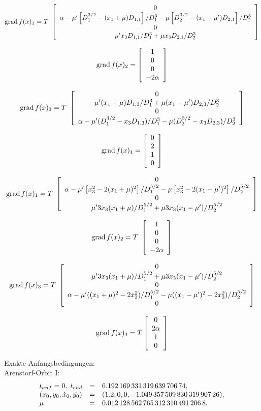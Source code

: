 \documentclass[12pt,a4paper,twoside,leqno]{article}
\begin{document}
{\large
\[
\grad f(x)_1
= T\ \ba{[}{c}
0\\
\alpha
 - \mu'\left[D^{3/2}_1 - (x_1 +\mu)D_{1,1}\right]/D^3_1
 - \mu\left[D^{3/2}_2 - (x_1-\mu')D_{2,1}\right]/D^3_2\\
0\\
\mu'x_3D_{1,1}/D^3_1+\mu x_3D_{2,1}/D^3_2
\ea{]}
\]

\[
\grad f(x)_2
= \ba{[}{c}1\\0\\0\\-2\alpha \ea{]}
\]

\[
\grad f(x)_3
= T\ \ba{[}{c}
0\\
\mu'(x_1+\mu)D_{1,3}/D^3_1 + \mu(x_1-\mu')D_{2,3}/D^3_2\\
0\\
\alpha - \mu'(D^{3/2}_1 - x_3D_{1,3})/D^3_1
-\mu(D^{3/2}_2 - x_3D_{2,3})/D^3_2
\ea{]}
\]

\[
\grad f(x)_4 = \ba{[}{c} 0\\2\\1\\ 0\ea{]}
\]

\[
\grad f(x)_1
= T\ \ba{[}{c}
0\\
\alpha - \mu'\left[x^2_3 - 2(x_1 +\mu)^2\right]/D^{5/2}_1
 - \mu\left[x^2_3 - 2(x_1-\mu')^2\right]/D^{5/2}_2\\
0\\
\mu'3x_3(x_1+\mu)/D^{5/2}_1+\mu 3x_3(x_1-\mu')/D^{5/2}_2
\ea{]}
\]

\[
\grad f(x)_2
= T\ \ba{[}{c}1\\0\\0\\-2\alpha\ea{]}
\]

\[
\grad f(x)_3
= T\ \ba{[}{c}
0\\
\mu'3x_3(x_1+\mu)/D^{5/2}_1 + \mu3x_3(x_1-\mu')/D^{5/2}_2\\
0\\
\alpha - \mu'((x_1+\mu)^2 -2x^2_3)/D^{5/2}_1-\mu((x_1-\mu')^2 - 2x^2_3)/D^{5/2}_2\\
0
\ea{]}
\]

\[
\grad f(x)_4
= T\ba{[}{c} 0\\2\alpha\\1\\0\ea{]}
\]
}
Exakte Anfangsbedingungen:\\
{\sc Arenstorf}-Orbit I:
\[
\left. \begin{array}{lcl}
t_{anf} = 0, \;
t_{end} &=& 6.192 \, 169 \, 331 \, 319 \, 639 \, 706 \, 74,\\
(x_0,y_0,\dot{x}_0, \dot{y_0}) &=& (1.2, 0, 0, -1.049 \, 357 \, 509 \, 830 \,
319 \, 907 \, 26),\\
\mu  &=& 0.012 \, 128 \, 562 \, 765 \, 312 \, 310 \, 491 \, 206 \, 8.
\ea{.}
\]
\end{document}
